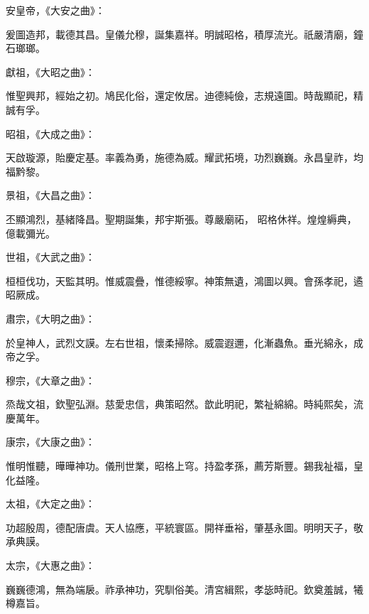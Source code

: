 \begin{pinyinscope}
 安皇帝，《大安之曲》：



 爰圖造邦，載德其昌。皇儀允穆，誕集嘉祥。明誠昭格，積厚流光。祇嚴清廟，鐘石瑯瑯。



 獻祖，《大昭之曲》：



 惟聖興邦，經始之初。鳩民化俗，還定攸居。迪德純儉，志規遠圖。時哉顯祀，精誠有孚。



 昭祖，《大成之曲》：



 天啟璇源，貽慶定基。率義為勇，施德為威。耀武拓境，功烈巍巍。永昌皇祚，均福黔黎。



 景祖，《大昌之曲》：



 丕顯鴻烈，基緒降昌。聖期誕集，邦宇斯張。尊嚴廟祏，
 昭格休祥。煌煌縟典，億載彌光。



 世祖，《大武之曲》：



 桓桓伐功，天監其明。惟威震疊，惟德綏寧。神策無遺，鴻圖以興。會孫孝祀，遹昭厥成。



 肅宗，《大明之曲》：



 於皇神人，武烈文謨。左右世祖，懷柔掃除。威震遐邇，化漸蟲魚。垂光綿永，成帝之孚。



 穆宗，《大章之曲》：



 烝哉文祖，欽聖弘淵。慈愛忠信，典策昭然。歆此明祀，繁祉綿綿。時純熙矣，流慶萬年。



 康宗，《大康之曲》：



 惟明惟聽，曄曄神功。儀刑世業，昭格上穹。持盈孝孫，薦芳斯豐。錫我祉福，皇化益隆。



 太祖，《大定之曲》：



 功超殷周，德配唐虞。天人協應，平統寰區。開祥垂裕，肇基永圖。明明天子，敬承典謨。



 太宗，《大惠之曲》：



 巍巍德鴻，無為端扆。祚承神功，究馴俗美。清宮緝熙，孝毖時祀。欽奠羞誠，犧樽嘉旨。




\end{pinyinscope}
